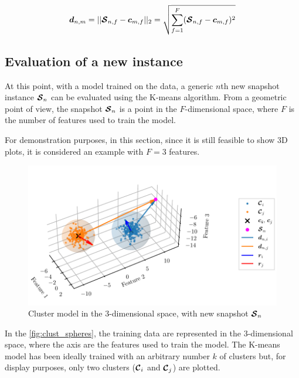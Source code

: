\begin{equation}
  \label{eq:clust_dist}
  \bm{d}_{n,m} = ||\bm{\mathcal{S}}_{n,f} - \bm{c}_{m,f}||_2 = \sqrt{\sum_{f=1}^{F} (\bm{\mathcal{S}}_{n,f} - \bm{c}_{m,f})^2}
\end{equation}

\subsection{Evaluation of a new instance}

At this point, with a model trained on the data, a generic $n$th new snapshot instance $\bm{\mathcal{S}}_n$ can be evaluated using the K-means algorithm.
From a geometric point of view, the snapshot $\bm{\mathcal{S}}_n$ is a point in the ${F}$-dimensional space, where ${F}$ is the number of features used to train the model.

For demonstration purposes, in this section, since it is still feasible to show 3D plots, it is considered an example with ${F}=3$ features.

\begin{figure}[htbp]
  \centering
  \includegraphics[width=\textwidth]{images/Spheres_2.pdf}
  \caption{Cluster model in the $3$-dimensional space, with new snapshot $\bm{\mathcal{S}}_n$}
  \label{fig:clust_spheres}
\end{figure}

In the \autoref{fig:clust_spheres}, the training data are represented in the $3$-dimensional space, where the axis are the features used to train the model. The K-means model has been ideally trained with an arbitrary number $k$ of clusters but, for display purposes, only two clusters  ($\bm{\mathcal{C}}_i$ and $\bm{\mathcal{C}}_j$) are plotted.
